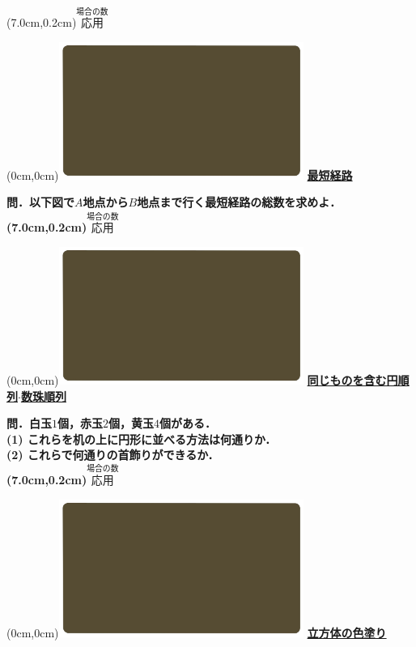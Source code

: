 \documentclass[10pt,
fleqn,
dvipdfmx,
uplatex
]{jsarticle}
\begin{document}
\at(7.0cm,0.2cm){\small\color{bradorange}$\overset{\text{場合の数}}{\text{応用}}$}


\newpage



\at(0cm,0cm){\includegraphics[width=8cm,bb=0 0 1920 1080]{./youtube/thumbnails/templates/smart_background/場合の数.jpeg}}
{\color{orange}\bf\boldmath\huge\underline{最短経路}}\vspace{0.3zw}

\huge 
\bf\boldmath 問．以下図で$A$地点から$B$地点まで行く最短経路の総数を求めよ．
\at(7.0cm,0.2cm){\small\color{bradorange}$\overset{\text{場合の数}}{\text{応用}}$}


\newpage



\at(0cm,0cm){\includegraphics[width=8cm,bb=0 0 1920 1080]{./youtube/thumbnails/templates/smart_background/場合の数.jpeg}}
{\color{orange}\bf\boldmath\Large\underline{同じものを含む円順列$\cdot$数珠順列}}\vspace{0.3zw}

\Large 
\bf\boldmath 問．白玉$1$個，赤玉$2$個，黄玉$4$個がある．\\
(1)  これらを机の上に円形に並べる方法は何通りか．\\
(2)  これらで何通りの首飾りができるか．\\

\at(7.0cm,0.2cm){\small\color{bradorange}$\overset{\text{場合の数}}{\text{応用}}$}


\newpage



\at(0cm,0cm){\includegraphics[width=8cm,bb=0 0 1920 1080]{./youtube/thumbnails/templates/smart_background/場合の数.jpeg}}
{\color{orange}\bf\boldmath\huge\underline{立方体の色塗り}}\vspace{0.3zw}
\end{document}
